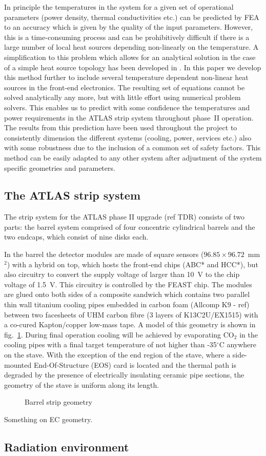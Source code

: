 In principle the temperatures in the system for a given set of operational parameters (power density, thermal conductivities etc.) can be predicted by FEA to an accuracy which is given by the quality of the input parameters. However, this is a time-consuming process and can be prohibitively difficult if there is a large number of local heat sources depending non-linearly on the temperature. A simplification to this problem which allows for an analytical solution in the case of a simple heat source topology has been developed in \cite{Beck:2010zzd}. In this paper we develop this method further to include several temperature dependent non-linear heat sources in the front-end electronics. The resulting set of equations cannot be solved analytically any more, but with little effort using numerical problem solvers. This enables us to predict with some confidence the temperatures and power requirements in the ATLAS strip system throughout phase~II operation. The results from this prediction have been used throughout the project to consistently dimension the different systems (cooling, power, services etc.) also with some robustness due to the inclusion of a common set of safety factors. This method can be easily adapted to any other system after adjustment of the system specific geometries and parameters.

\subsection{The ATLAS strip system}
The strip system for the ATLAS phase II upgrade (ref TDR) consists of two parts: the barrel system comprised of four concentric cylindrical barrels and the two endcaps, which consist of nine disks each. 

In the barrel the detector modules are made of square sensors ($96.85\times 96.72$~mm$^2$) with a hybrid on top, which hosts the front-end chips (ABC* and HCC*), but also circuitry to convert the supply voltage of larger than 10~V to the chip voltage of 1.5~V. This circuitry is controlled by the FEAST chip. The modules are glued onto both sides of a composite sandwich which contains two parallel thin wall titanium cooling pipes embedded in carbon foam (Allcomp K9 - ref)  between two facesheets of UHM carbon fibre (3 layers of K13C2U/EX1515) with a co-cured Kapton/copper low-mass tape. A model of this geometry is shown in fig.~\ref{fig:barrelgeometry}. During final operation cooling will be achieved by evaporating CO$_2$ in the cooling pipes with a final target temperature of not higher than -35$^\circ$C anywhere on the stave. With the exception of the end region of the stave, where a side-mounted End-Of-Structure (EOS) card is located and the thermal path is degraded by the presence of electrically insulating ceramic pipe sections, the geometry of the stave is uniform along its length. 

\begin{figure}[ht]
\centering
\caption{Barrel strip geometry}
\label{fig:barrelgeometry}
\end{figure}

Something on EC geometry.

\subsection{Radiation environment}
